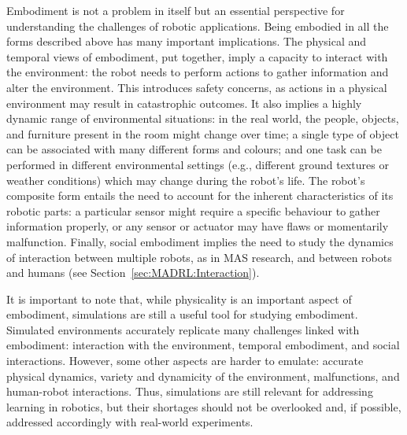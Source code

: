 Embodiment is not a problem in itself but an essential perspective for understanding the challenges of robotic applications. Being embodied in all the forms described above has many important implications. 
The physical and temporal views of embodiment, put together, imply a capacity to interact with the environment: the robot needs to perform actions to gather information and alter the environment. This introduces safety concerns, as actions in a physical environment may result in catastrophic outcomes. It also implies a highly dynamic range of environmental situations: in the real world, the people, objects, and furniture present in the room might change over time; a single type of object can be associated with many different forms and colours; and one task can be performed in different environmental settings (e.g., different ground textures or weather conditions) which may change during the robot's life. 
The robot's composite form entails the need to account for the inherent characteristics of its robotic parts: a particular sensor might require a specific behaviour to gather information properly, or any sensor or actuator may have flaws or momentarily malfunction. 
Finally, social embodiment implies the need to study the dynamics of interaction between multiple robots, as in MAS research, and between robots and humans (see Section~\ref{sec:MADRL:Interaction}). 

It is important to note that, while physicality is an important aspect of embodiment, simulations are still a useful tool for studying embodiment. Simulated environments accurately replicate many challenges linked with embodiment: interaction with the environment, temporal embodiment, and social interactions. However, some other aspects are harder to emulate: accurate physical dynamics, variety and dynamicity of the environment, malfunctions, and human-robot interactions. Thus, simulations are still relevant for addressing learning in robotics, but their shortages should not be overlooked and, if possible, addressed accordingly with real-world experiments. 


\conclusionseparator

